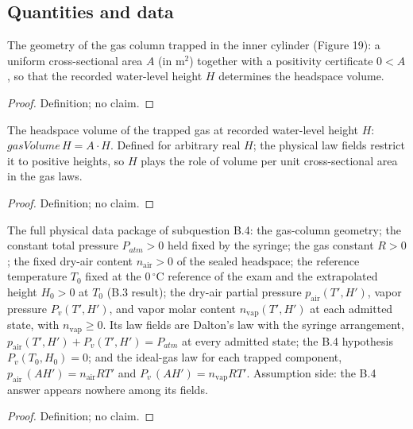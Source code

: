 \subsection*{Quantities and data}

\begin{definition}
\label{def:IPhO2026Problems_problem_IPhO_2026_4_B_4:GasColumnGeometry}
The geometry of the gas column trapped in the inner cylinder (Figure 19):
a uniform cross-sectional area $A$ (in $\mathrm{m}^2$) together with a
positivity certificate $0 < A$, so that the recorded water-level height
$H$ determines the headspace volume.
\end{definition}
\begin{proof}
Definition; no claim.
\end{proof}

\begin{definition}
\label{def:IPhO2026Problems_problem_IPhO_2026_4_B_4:gasVolume}
The headspace volume of the trapped gas at recorded water-level height
$H$: $\mathit{gasVolume}\,H = A \cdot H$.  Defined for arbitrary real
$H$; the physical law fields restrict it to positive heights, so $H$
plays the role of volume per unit cross-sectional area in the gas laws.
\end{definition}
\begin{proof}
Definition; no claim.
\end{proof}

\begin{definition}
\label{def:IPhO2026Problems_problem_IPhO_2026_4_B_4:VaporPressureB4Data}
The full physical data package of subquestion B.4: the gas-column
geometry; the constant total pressure $P_{atm} > 0$ held fixed by the
syringe; the gas constant $R > 0$; the fixed dry-air content
$n_{\mathrm{air}} > 0$ of the sealed headspace; the reference temperature
$T_0$ fixed at the $0\,^\circ\mathrm{C}$ reference of the exam and the
extrapolated height $H_0 > 0$ at $T_0$ (B.3 result); the dry-air partial
pressure $p_{\mathrm{air}}(T',H')$, vapor pressure $P_v(T',H')$, and
vapor molar content $n_{\mathrm{vap}}(T',H')$ at each admitted state,
with $n_{\mathrm{vap}} \ge 0$.  Its law fields are Dalton's law with the
syringe arrangement, $p_{\mathrm{air}}(T',H') + P_v(T',H') = P_{atm}$ at
every admitted state; the B.4 hypothesis $P_v(T_0, H_0) = 0$; and the
ideal-gas law for each trapped component,
$p_{\mathrm{air}}\,(A H') = n_{\mathrm{air}} R T'$ and
$P_v\,(A H') = n_{\mathrm{vap}} R T'$.  Assumption side: the B.4 answer
appears nowhere among its fields.
\end{definition}
\begin{proof}
Definition; no claim.
\end{proof}

